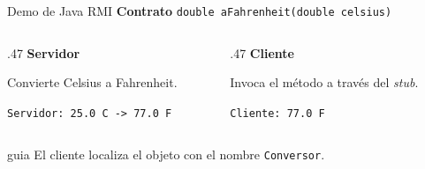\documentclass[aspectratio=169,12pt]{beamer}
\newcommand{\turno}{}
\newcommand{\bloque}[1]{\renewcommand{\turno}{#1}}
\begin{document}
\bloque{Belinda Toaquiza}
\begin{frame}{Demo de Java RMI}
  \textbf{Contrato} \quad \texttt{double aFahrenheit(double celsius)}\par
  \bigskip
  \begin{columns}[onlytextwidth,T]
    \begin{column}{.47\linewidth}
      \textbf{Servidor}\par\smallskip
      Convierte Celsius a Fahrenheit.\par\smallskip
      {\footnotesize\texttt{Servidor: 25.0 C -> 77.0 F}}
    \end{column}
    \begin{column}{.47\linewidth}
      \textbf{Cliente}\par\smallskip
      Invoca el método a través del \emph{stub}.\par\smallskip
      {\footnotesize\texttt{Cliente: 77.0 F}}
    \end{column}
  \end{columns}
  \par\medskip
  \begin{beamercolorbox}[wd=\linewidth,sep=1ex]{guia}
    \small El cliente localiza el objeto con el nombre \texttt{Conversor}.
  \end{beamercolorbox}
\end{frame}
\end{document}
